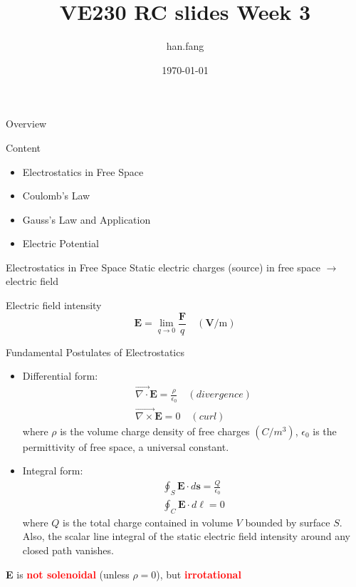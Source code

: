 \documentclass[xcolor={dvipsnames}]{beamer}
\title[VE230 RC slides week 1]{VE230 RC slides Week 3}
\author{han.fang }
\date{\today}
\begin{document}
\begin{frame}
\titlepage
\end{frame}
\begin{frame}{Overview}
\begin{block}{Content}
	\begin{itemize}
		\item Electrostatics in Free Space
		\item Coulomb’s Law
		\item Gauss’s Law and Application
		\item Electric Potential
	\end{itemize}
\end{block}

\end{frame}
\begin{frame}{Electrostatics in Free Space}
Static electric charges (source) in free space $\rightarrow$ electric field
\begin{block}{Electric field intensity}
\[
\mathbf{E}=\lim _{q \rightarrow 0} \frac{\mathbf{F}}{q} \quad(\mathbf{V} / \mathrm{m})
\]
\end{block}
\end{frame}
\begin{frame}{Fundamental Postulates of Electrostatics}
\begin{itemize}
\item Differential form:
\[
\begin{aligned}
\vec{\nabla \cdot} \mathbf{E}=\frac{\rho}{\epsilon_{0}} \quad (divergence)\\
\vec{\nabla \times} \mathbf{E}=0 \quad (curl)
\end{aligned}
\]
where $\rho$ is the volume charge density of free charges $(C/m^3)$, $\epsilon_0$ is the permittivity of free space, a universal constant.
\item Integral form:
\[
\begin{aligned}
\oint_{S} \mathbf{E} \cdot d \mathbf{s}=\frac{Q}{\epsilon_{0}} \\
\oint_{C} \mathbf{E} \cdot d \ell=0
\end{aligned}
\]
where $Q$ is the total charge contained in volume $V$ bounded by surface $S$. Also, the scalar line integral of the static electric field intensity around any closed path vanishes.
\end{itemize}
\textbf{E} is \textcolor{red}{\textbf{not solenoidal}} (unless $\rho=0$), but \textcolor{red}{\textbf{irrotational}}
\end{frame}
\end{document}
